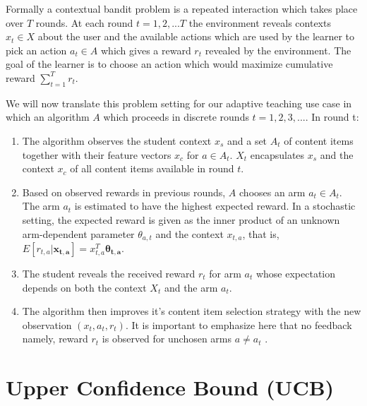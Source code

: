 Formally a contextual bandit problem is a repeated interaction which takes place over $T$ rounds. At each round $t = 1,2,...T$ the environment reveals contexts $x_t \in X$ about the user and the available actions which are used by the learner to pick an action $a_t \in A$ which gives a reward $r_t$ revealed by the environment. The goal of the learner is to choose an action which would maximize cumulative reward $\sum_{t=1}^{T} r_t$. \par

We will now translate this problem setting for our adaptive teaching use case in which an algorithm $A$ which proceeds in discrete rounds $t = 1,2,3,...$. In round t: 
\begin{enumerate}
\item The algorithm observes the student context $x_s$ and a set $A_t$ of content items together with their feature vectors $x_{c}$ for $a \in A_t$. $X_{t}$ encapsulates $x_s$ and the context ${x_c}$ of all content items available in round $t$.
\item Based on observed rewards in previous rounds, $A$ chooses an arm $a_t \in A_t$. The arm $a_t$ is estimated to have the highest expected reward. In a stochastic setting, the expected reward is given as the inner product of an unknown arm-dependent parameter $\theta_{a,t}$ and the context $x_{t,a}$, that is, $E[r_{t,a}|\mathbf{x_{t,a}}] = x^{T}_{t,a}\mathbf{\theta_{t,a}}$. 
\item The student reveals the received reward $r_t$ for arm $a_t$ whose expectation depends on both the context $X_t$ and the arm $a_t$. 
\item The algorithm then improves it's content item selection strategy with the new observation $(x_t,a_t,r_t)$. It is important to emphasize here that no feedback namely, reward $r_{t}$ is observed for unchosen arms $a \neq a_t$ \cite{li2010contextual}.
\end{enumerate}

\section{Upper Confidence Bound (UCB) \label{chap2:UCB}}

